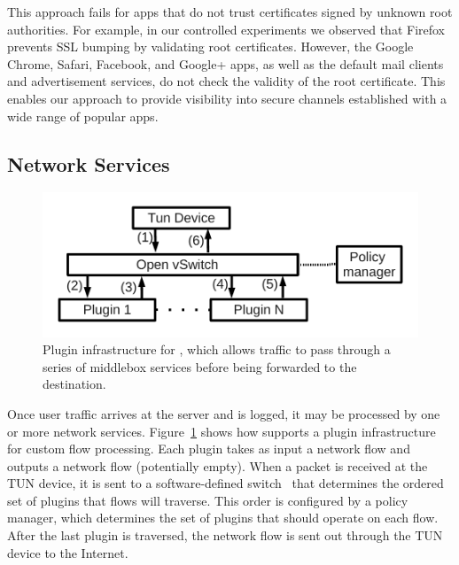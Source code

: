 This approach fails for apps that do not trust certificates signed by unknown root authorities. 
For example, in our controlled experiments we observed that Firefox prevents SSL bumping by validating root certificates. 
However, the Google Chrome, Safari, Facebook, and Google+ apps, as well as the default mail clients and advertisement services, do not check the validity of the root certificate. 
This enables our approach to provide visibility into secure channels established with a wide range of popular apps. 


\subsection{Network Services}
\label{subsec:meddlebox}
\begin{figure}
\begin{center}
\includegraphics[width=\columnwidth]{figures/packet-monitoring-plugin.pdf}
\end{center}
\vspace{\postfigspace}
\caption{Plugin infrastructure for \platname, which allows traffic to pass through 
a series of middlebox services before being forwarded to the destination. }
\label{fig:packet-monitoring-solution}
\vspace{\postfigspace}
\end{figure}

Once user traffic arrives at the server and is logged, it may be processed by one or more network services.
Figure~\ref{fig:packet-monitoring-solution} shows how 
\platname{} supports a plugin
infrastructure for custom flow processing. Each plugin takes as input a 
network flow and outputs a network flow (potentially empty). 
When a packet is received at the TUN
device, it is sent to a software-defined switch~\cite{Openvswitch} that 
determines the ordered set of plugins that flows will traverse. 
This order is configured by a policy manager, which determines 
the set of plugins that should operate on each flow. After the last 
plugin is traversed, the network flow is sent out through the TUN device 
to the Internet. 

